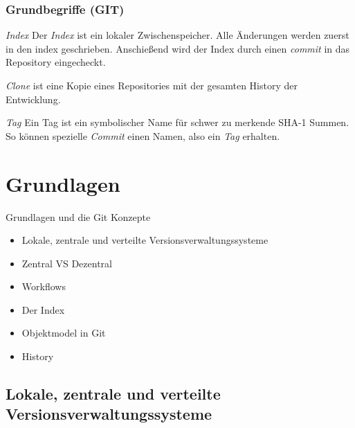 \documentclass{beamer}
\begin{document}
\begin{frame}\frametitle{Grundbegriffe (GIT)}
\begin{block}{\textit{Index}}
Der \textit{Index} ist ein lokaler Zwischenspeicher. Alle Änderungen werden zuerst in den index geschrieben. Anschießend wird der Index durch einen \textit{commit} in das Repository eingecheckt. 
\end{block}
\begin{block}{\textit{Clone}}
ist eine Kopie eines Repositories mit der gesamten History der Entwicklung.
\end{block}
\begin{block}{\textit{Tag}}
Ein Tag ist ein symbolischer Name für schwer zu merkende SHA-1 Summen. So können spezielle \textit{Commit} einen Namen, also ein \textit{Tag} erhalten. 
\end{block}
\end{frame}

\section{Grundlagen}
\begin{frame}[c]
\begin{center}
\begin{Huge}
Grundlagen und die Git Konzepte
\end{Huge}
\begin{itemize}
\vspace{1.5cm}
\item Lokale, zentrale und verteilte Versionsverwaltungssysteme
\item Zentral VS Dezentral
\item Workflows
\item Der Index
\item Objektmodel in Git
\item History

\end{itemize}
\end{center}
\end{frame}


\subsection{Lokale, zentrale und verteilte Versionsverwaltungssysteme} 
\end{document}
